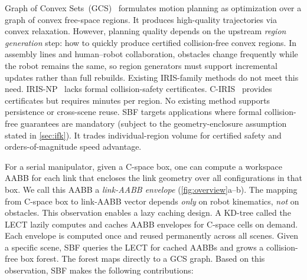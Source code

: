 \documentclass[letterpaper, conference]{IEEEtran}
\begin{document}
Graph of Convex Sets~(GCS)~\cite{marcucci2024motion}
formulates motion planning as optimization over a graph of convex
free-space regions.
It produces high-quality trajectories via convex relaxation.
However, planning quality depends on the upstream \emph{region generation}
step: how to quickly produce certified collision-free convex regions.
In assembly lines and human--robot collaboration, obstacles change
frequently while the robot remains the same, so region generators
must support incremental updates rather than full rebuilds.
Existing IRIS-family methods do not meet this need.
IRIS-NP~\cite{petersen2023growing} lacks formal collision-safety
certificates.
C-IRIS~\cite{werner2024certified} provides certificates but requires
minutes per region.
No existing method supports persistence or cross-scene reuse.
SBF targets applications where formal collision-free guarantees are
mandatory (subject to the geometry-enclosure assumption stated in
\cref{sec:ifk}).
It trades individual-region volume for certified safety and
orders-of-magnitude speed advantage.

For a serial manipulator, given a C-space box, one can compute a
workspace AABB for each link that encloses the link geometry over all
configurations in that box.
We call this AABB a \emph{link-AABB envelope}
(\cref{fig:overview}a--b).
The mapping from C-space box to link-AABB vector depends \emph{only}
on robot kinematics, \emph{not} on obstacles.
This observation enables a lazy caching design.
A KD-tree called the LECT lazily
computes and caches AABB envelopes for C-space cells on demand.
Each envelope is computed once and reused permanently across all scenes.
Given a specific scene, SBF queries the LECT for cached AABBs and
grows a collision-free box forest.
The forest maps directly to a GCS graph.
Based on this observation, SBF makes the following contributions:
\end{document}
